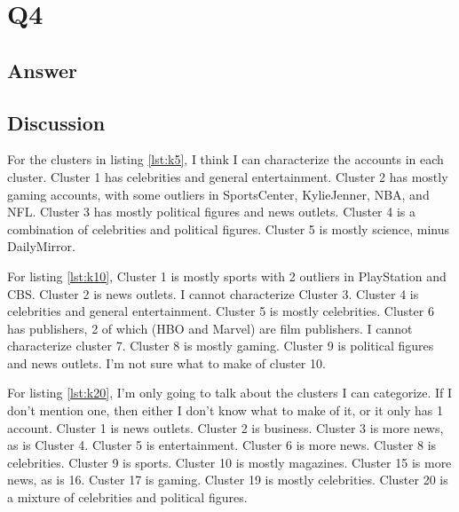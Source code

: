 \documentclass[12pt]{article}
\begin{document}
\section*{Q4}

\subsection*{Answer}









\subsection*{Discussion}

For the clusters in listing \ref{lst:k5}, I think I can characterize the accounts in each cluster.  Cluster 1 has celebrities and general entertainment.  Cluster 2 has mostly gaming accounts, with some outliers in SportsCenter, KylieJenner, NBA, and NFL.  Cluster 3 has mostly political figures and news outlets.  Cluster 4 is a combination of celebrities and political figures.  Cluster 5 is mostly science, minus DailyMirror.

For listing \ref{lst:k10}, Cluster 1 is mostly sports with 2 outliers in PlayStation and CBS.  Cluster 2 is news outlets.  I cannot characterize Cluster 3.  Cluster 4 is celebrities and general entertainment.  Cluster 5 is mostly celebrities.  Cluster 6 has publishers, 2 of which (HBO and Marvel) are film publishers.  I cannot characterize cluster 7.  Cluster 8 is mostly gaming.  Cluster 9 is political figures and news outlets.  I'm not sure what to make of cluster 10.

For listing \ref{lst:k20}, I'm only going to talk about the clusters I can categorize. If I don't mention one, then either I don't know what to make of it, or it only has 1 account.  Cluster 1 is news outlets.  Cluster 2 is business.  Cluster 3 is more news, as is Cluster 4.  Cluster 5 is entertainment.  Cluster 6 is more news.  Cluster 8 is celebrities.  Cluster 9 is sports.  Cluster 10 is mostly magazines.  Cluster 15 is more news, as is 16.  Custer 17 is gaming.  Cluster 19 is mostly celebrities.  Cluster 20 is a mixture of celebrities and political figures.
\end{document}
